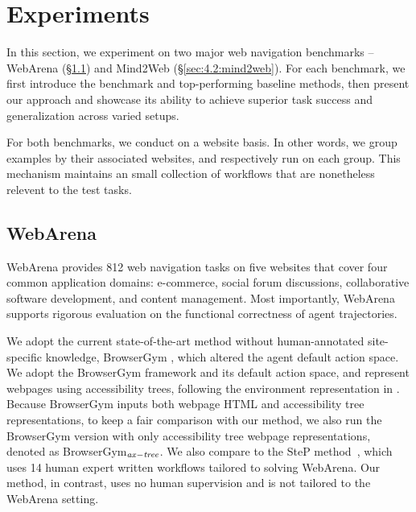 \section{Experiments}
\label{sec:4:experiments}

In this section, we experiment on two major web navigation benchmarks -- WebArena (\S\ref{sec:4.1:webarena}) and Mind2Web (\S\ref{sec:4.2:mind2web}). For each benchmark, we first introduce the benchmark and top-performing baseline methods, then present our \awm approach and showcase its ability to achieve superior task success and generalization across varied setups.

For both benchmarks, we conduct \awm on a website basis. In other words, we group examples by their associated websites, and respectively run \awm on each group. This mechanism maintains an small collection of workflows that are nonetheless relevent to the test tasks.

\subsection{WebArena}
\label{sec:4.1:webarena}

WebArena \citep{zhou2024webarena} provides 812 web navigation tasks on five websites that cover four common application domains: e-commerce, social forum discussions, collaborative software development, and content management. Most importantly, WebArena supports rigorous evaluation on the functional correctness of agent trajectories. 

We adopt the current state-of-the-art method without human-annotated site-specific knowledge, BrowserGym \citep{drouin2024workarena}, which altered the agent default action space. We adopt the BrowserGym framework and its default action space, and represent webpages using accessibility trees, following the environment representation in \citet{zhou2024webarena}. Because BrowserGym inputs both webpage HTML and accessibility tree representations, to keep a fair comparison with our method, we also run the BrowserGym version with only accessibility tree webpage representations, denoted as BrowserGym$_{\it ax-tree}$.
%
We also compare to the SteP method~\citep{sodhi2023heap}, which uses 14 human expert written workflows tailored to solving WebArena. Our method, in contrast, uses no human supervision and is not tailored to the WebArena setting.


